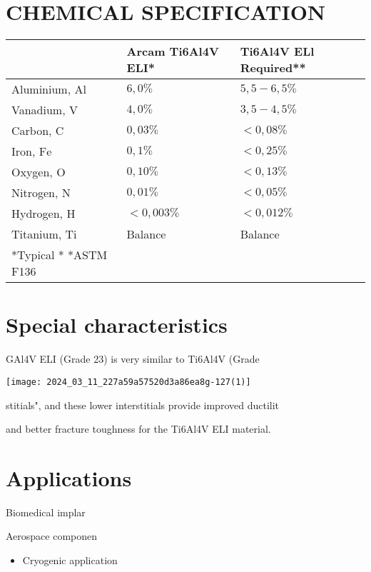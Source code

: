 \documentclass[10pt]{article}
\begin{document}
\section*{CHEMICAL SPECIFICATION}
\begin{center}
\begin{tabular}{lll}
 & Arcam Ti6Al4V ELI* & Ti6Al4V ELl Required** \\
\hline
Aluminium, Al & $6,0 \%$ & $5,5-6,5 \%$ \\
\hline
Vanadium, $\mathrm{V}$ & $4,0 \%$ & $3,5-4,5 \%$ \\
\hline
Carbon, $\mathrm{C}$ & $0,03 \%$ & $<0,08 \%$ \\
\hline
Iron, $\mathrm{Fe}$ & $0,1 \%$ & $<0,25 \%$ \\
\hline
Oxygen, $\mathrm{O}$ & $0,10 \%$ & $<0,13 \%$ \\
\hline
Nitrogen, $\mathrm{N}$ & $0,01 \%$ & $<0,05 \%$ \\
\hline
Hydrogen, $\mathrm{H}$ & $<0,003 \%$ & $<0,012 \%$ \\
\hline
Titanium, Ti & Balance & Balance \\
\hline
*Typical * *ASTM F136 &  &  \\
\hline
\end{tabular}
\end{center}

\section*{Special characteristics}
GAl4V ELI (Grade 23) is very similar to Ti6Al4V (Grade

\begin{center}
\texttt{[image: 2024\_03\_11\_227a59a57520d3a86ea8g-127(1)]}
\end{center}

stitials", and these lower interstitials provide improved ductilit

and better fracture toughness for the Ti6Al4V ELI material.

\section*{Applications}
Biomedical implar

Aerospace componen

\begin{itemize}
  \item Cryogenic application
\end{itemize}
\end{document}
